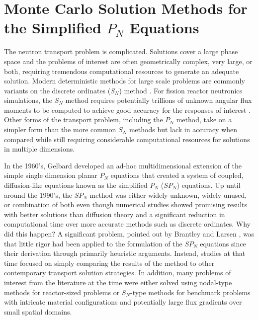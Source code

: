 \chapter{Monte Carlo Solution Methods for the Simplified $P_N$ Equations}
\label{ch:spn_equations}

The neutron transport problem is complicated. Solutions cover a large
phase space and the problems of interest are often geometrically
complex, very large, or both, requiring tremendous computational
resources to generate an adequate solution. Modern deterministic
methods for large scale problems are commonly variants on the discrete
ordinates ($S_N$) method \citep{evans_denovo:_2010}. For fission
reactor neutronics simulations, the $S_N$ method requires potentially
trillions of unknown angular flux moments to be computed to achieve
good accuracy for the responses of interest
\citep{slaybaugh_acceleration_2011}. Other forms of the transport
problem, including the $P_N$ method, take on a simpler form than the
more common $S_N$ methods but lack in accuracy when compared while
still requiring considerable computational resources for solutions in
multiple dimensions.

In the 1960's, Gelbard developed an ad-hoc multidimensional extension
of the simple single dimension planar $P_N$ equations that created a
system of coupled, diffusion-like equations known as the simplified
$P_N$ ($SP_N$) equations. Up until around the 1990's, the $SP_N$
method was either widely unknown, widely unused, or combination of
both even though numerical studies showed promising results with
better solutions than diffusion theory and a significant reduction in
computational time over more accurate methods such as discrete
ordinates. Why did this happen? A significant problem, pointed out by
Brantley and Larsen \citep{brantley_simplified_2000}, was that little
rigor had been applied to the formulation of the $SP_N$ equations
since their derivation through primarily heuristic arguments. Instead,
studies at that time focused on simply comparing the results of the
method to other contemporary transport solution strategies. In
addition, many problems of interest from the literature at the time
were either solved using nodal-type methods for reactor-sized problems
or $S_N$-type methods for benchmark problems with intricate material
configurations and potentially large flux gradients over small spatial
domains.

